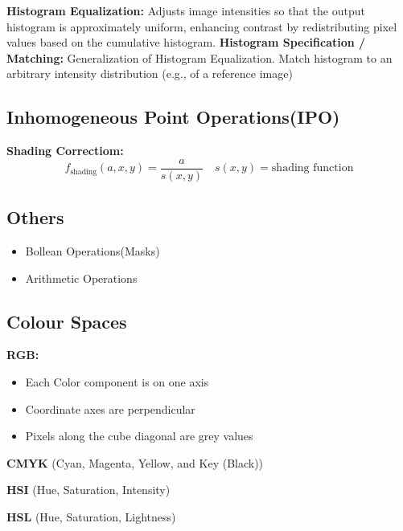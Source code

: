 \textbf{Histogram Equalization:} Adjusts image intensities so that the output histogram is approximately uniform, enhancing contrast by redistributing pixel values based on the cumulative histogram.
\textbf{Histogram Specification / Matching:} Generalization of Histogram Equalization. Match histogram to an arbitrary intensity distribution (e.g., of a reference image)

\subsection{Inhomogeneous Point Operations(IPO)}
\textbf{Shading Correctiom:}
\[
f_{\text{shading}}(a,x,y) = \frac{a}{s(x,y)} \quad s(x,y) = \text{shading function}
\]
\subsection{Others}
\begin{itemize}
    \item Bollean Operations(Masks)
    \item Arithmetic Operations
\end{itemize}
\subsection{Colour Spaces}
\textbf{RGB:}
\begin{itemize}
    \item Each Color component is on one axis
    \item Coordinate axes are perpendicular
    \item Pixels along the cube diagonal are grey values
\end{itemize}
\textbf{CMYK} (Cyan, Magenta, Yellow, and Key (Black))

\textbf{HSI} (Hue, Saturation, Intensity)

\textbf{HSL} (Hue, Saturation, Lightness)